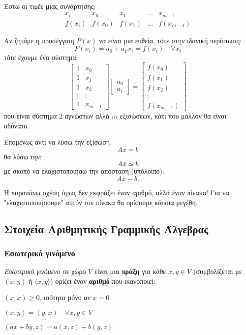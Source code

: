 \documentclass[11pt,a4paper,notitlepage,fleqn,draft]{article}
\begin{document}
	\paragraph{}
	Έστω οι τιμές μιας συνάρτησης:
	\[
	\begin{array}{r|c|c|c|c}
	x_i & x_0 & x_1 & \dots & x_{m-1} \\ \hline
	f(x_i) & f(x_0) & f(x_1) & \dots & f(x_{m-1})
	\end{array}
	\]
	
	Αν ζητάμε η προσέγγιση \( P(x) \) να είναι μια ευθεία, τότε στην
	ιδανική περίπτωση:
	\[
	P(x_i) = a_0 + a_1x_i = f(x_i) \quad \forall x_i
	\]
	τότε έχουμε ένα σύστημα:
	\[
	\left[
	\begin{matrix}
	1 & x_0 \\ 1 & x_1 \\ 1 & x_2 \\ \vdots & \vdots \\ 1 & x_{m-1}
	\end{matrix}
	\right] \left[
	\begin{matrix}
	a_0 \\ a_1
	\end{matrix}
	\right] = \left[
	\begin{matrix}
	f(x_0) \\ f(x_1) \\ f(x_2) \\ \vdots \\ f(x_{m-1})
	\end{matrix}
	\right]
	\]
	που είναι σύστημα 2 αγνώστων αλλά \( m \) εξισώσεων, κάτι που μάλλον
	θα είναι αδύνατο.
	
	Επομένως αντί να λύσω την εξίσωση:
	\[
	Ax = b
	\]
	θα λύσω την:
	\[
	A\bar x \simeq b
	\]
	με σκοπό να ελαχιστοποιήσω την απόσταση (υπόλοιπο):
	\[
	A\bar x -b.
	\]
	
	Η παραπάνω σχέση όμως δεν εκφράζει έναν αριθμό, αλλά έναν πίνακα!
	Για να "ελαχιστοποιήσουμε" αυτόν τον πίνακα θα ορίσουμε κάποια
	μεγέθη.
	
	\subsection{Στοιχεία Αριθμητικής Γραμμικής Άλγεβρας}
	\subsubsection{Εσωτερικό γινόμενο}
	\textit{Εσωτερικό γινόμενο} σε χώρο \( V \) είναι μια \textbf{πράξη}
	για κάθε \( x,y \in V \) 
	(συμβολίζεται με \( (x,y) \) ή \( \langle x,y \rangle \))
	ορίζει έναν \textbf{αριθμό} που ικανοποιεί:
	\begin{enumroman}
		\item \( (x,x) \geq 0 \), ισότητα μόνο αν \( x=0 \)
		\item \( (x,y) = (y,x) \quad \forall x,y\in V \)
		\item \( (ax+by,z) = a(x,z)+b(y,z) \)
	\end{enumroman}
	
\end{document}
